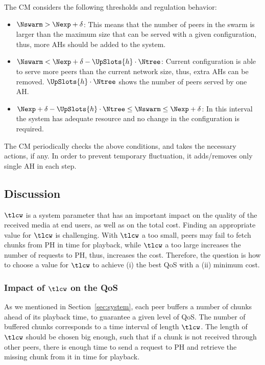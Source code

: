 The CM considers the following thresholds and regulation behavior:
\begin{itemize}
\item $\Nswarm > \Nexp + \delta$: This means that the number of peers in the swarm is larger than the maximum size that can be served with a given configuration, thus, more AHs should be added to the system. 
\item $\Nswarm < \Nexp + \delta - \UpSlots{h} \cdot \Ntree$: Current configuration is able to serve more peers than the current network size, thus, extra AHs can be removed. $\UpSlots{h} \cdot \Ntree$ shows the number of peers served by one AH. 
\item $\Nexp + \delta - \UpSlots{h} \cdot \Ntree \leq \Nswarm \leq \Nexp + \delta$: In this interval the system has adequate resource and no change in the configuration is required.
\end{itemize}

The CM periodically checks the above conditions, and takes the necessary actions,
if any. In order to prevent temporary fluctuation, it adds/removes only single
AH in each step.

\subsection{Discussion} \label{lcw}

$\tlcw$ is a system parameter that has an important impact on the quality of
the received media at end users, as well as on the total cost. Finding an
appropriate value for $\tlcw$ is challenging. With $\tlcw$ a too small, peers
may fail to fetch chunks from PH in time for playback, while 
$\tlcw$ a too large increases the number of requests to PH, thus, increases the cost.
Therefore, the question is how to choose a value for $\tlcw$ to achieve (i)
the best QoS with a (ii) minimum cost.

\subsubsection{Impact of $\tlcw$ on the QoS} 

As we mentioned in Section~\ref{sec:system}, each peer buffers a number of
chunks ahead of its playback time, to guarantee a given level of QoS. The
number of buffered chunks corresponds to a time interval of length $\tlcw$.
The length of $\tlcw$ should be chosen big enough, such that if a chunk is not
received through other peers, there is enough time to send a request to PH and
retrieve the missing chunk from it in time for playback.

